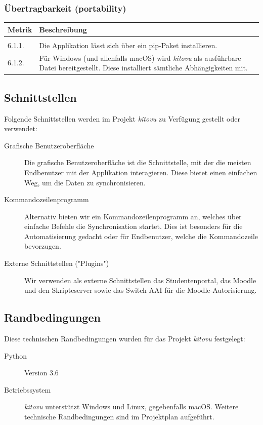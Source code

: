 \documentclass[a4paper]{article}
\begin{document}
\subsubsection{Übertragbarkeit (portability)}

\begin{tabulary}{\linewidth}{lL}
  \toprule
  Metrik & Beschreibung \\
  \midrule
   \\
  6.1.1. & Die Applikation lässt sich über ein pip-Paket\footnotemark{} installieren. \\
  6.1.2. & Für Windows (und allenfalls macOS) wird \emph{kitovu} als ausführbare Datei bereitgestellt. Diese installiert sämtliche Abhängigkeiten mit. \\
  \bottomrule
\end{tabulary}

\subsection{Schnittstellen}

Folgende Schnittstellen werden im Projekt \emph{kitovu} zu Verfügung gestellt oder verwendet:

\begin{description}
  \item[Grafische Benutzeroberfläche]
    Die grafische Benutzeroberfläche ist die Schnittstelle, mit der die meisten Endbenutzer mit der Applikation interagieren.
    Diese bietet einen einfachen Weg, um die Daten zu synchronisieren.
  \item[Kommandozeilenprogramm]
    Alternativ bieten wir ein Kommandozeilenprogramm an, welches über einfache Befehle die Synchronisation startet.
    Dies ist besonders für die Automatisierung gedacht oder für Endbenutzer, welche die Kommandozeile bevorzugen.
  \item[Externe Schnittstellen ("Plugins")]
    Wir verwenden als externe Schnittstellen das Studentenportal, das Moodle und den Skripteserver sowie das Switch AAI für die Moodle-Autorisierung.
\end{description}

\subsection{Randbedingungen}

Diese technischen Randbedingungen wurden für das Projekt \emph{kitovu} festgelegt:

\begin{description}
  \item[Python] Version 3.6
  \item[Betriebssystem] \emph{kitovu} unterstützt Windows und Linux, gegebenfalls macOS. Weitere technische Randbedingungen sind im Projektplan aufgeführt.
\end{description}
\end{document}
